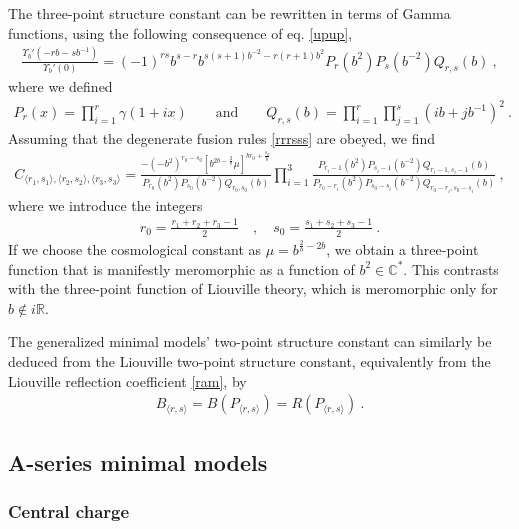 \documentclass[12pt, a4paper, notitlepage, twoside]{report}
\numberwithin{equation}{section}
\theoremstyle{break}
\begin{document}
The three-point structure constant can be rewritten in terms of Gamma functions, using the following consequence of eq. \eqref{upup},
\begin{align}
 \frac{\Upsilon_b'(-rb-sb^{-1})}{\Upsilon_b'(0)} = (-1)^{rs} b^{s-r} b^{s(s+1)b^{-2}-r(r+1)b^2} P_r(b^2)P_s(b^{-2}) Q_{r,s}(b)\ ,
\end{align}
where we defined
\begin{align}
 P_r(x) = \prod_{i=1}^r \gamma(1+ix) \qquad \text{and} \qquad Q_{r,s}(b) = \prod_{i=1}^r \prod_{j=1}^s (ib+jb^{-1})^2\ .
\end{align}
Assuming that the degenerate fusion rules \eqref{rrrsss} are obeyed, we find 
\begin{align}
 C_{\langle r_1,s_1\rangle ,\langle r_2,s_2\rangle ,\langle r_3,s_3 \rangle} =  \frac{-(-b^2)^{r_0-s_0}\left[b^{2b-\frac{2}{b}}\mu\right]^{br_0 + \frac{s_0}{b}}}{P_{r_0}(b^2)P_{s_0}(b^{-2})Q_{r_0,s_0}(b)} \prod_{i=1}^3 \frac{P_{r_i-1}(b^2)P_{s_i-1}(b^{-2}) Q_{r_i-1,s_i-1}(b)}{P_{r_0-r_i}(b^2)P_{s_0-s_i}(b^{-2}) Q_{r_0-r_i,s_0-s_i}(b)} \ ,
\label{cpqb}
\end{align}
where we introduce the integers
\begin{align}
 r_0 = \frac{r_1+r_2+r_3-1}{2} \quad , \quad s_0=\frac{s_1+s_2+s_3-1}{2}\ .
\end{align}
If we choose the cosmological constant as $\mu = b^{\frac{2}{b}-2b}$, we obtain a three-point function that is manifestly meromorphic as a function of $b^2\in {\mathbb{C}}^*$.
This contrasts with the three-point function of Liouville theory, which is
meromorphic only for $b\notin i\mathbb{R}$. 

The generalized minimal models' two-point structure constant can similarly be deduced from the Liouville two-point structure constant, equivalently from the Liouville reflection coefficient \eqref{ram}, by 
\begin{align}
B_{\langle r,s\rangle} = B(P_{\langle r,s\rangle}) = R(P_{\langle r,s\rangle})\ .
\end{align}


\subsection{A-series minimal models \label{secamm}}

\subsubsection{Central charge}
\end{document}

